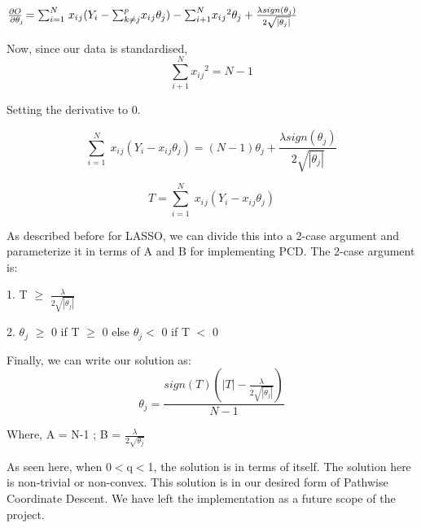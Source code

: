 \documentclass[11pt]{article}
\begin{document}
$\frac{\partial O}{\partial \theta_{\rlap{$\scriptscriptstyle j$}}} = {\sum}_{i=1}^{N} \; x_i{_j}(Y_i - {\sum}_{k\neq j}^{p} x_i{_j}\theta_j) - {\sum}_{i+1}^{N} x_i{_j}^2\theta_j + \frac{\lambda sign(\theta_j)}{2 \sqrt{|\theta_j|}}$
\newline

Now, since our data is standardised, 
\newline
\begin{equation}
    {\sum}_{i+1}^{N} x_i{_j}^2 = N-1
\end{equation}

\newline

Setting the derivative to 0. 

\newline
\begin{equation}
   {\sum}_{i=1}^{N} \; x_i{_j}(Y_i - x_i{_j}\theta_j) = (N-1)\theta_j + \frac{\lambda sign(\theta_j)}{2 \sqrt{|\theta_j|}}
\end{equation}
\newline

\begin{equation}
    T = {\sum}_{i=1}^{N} \; x_i{_j}(Y_i - x_i{_j}\theta_j)
\end{equation}
\newline

As described before for LASSO, we can divide this into a 2-case argument and parameterize it in terms of A and B for implementing PCD. 
\newline
The 2-case argument is:
\newline

1. T $\geq$ $ \frac{\lambda }{2 \sqrt{|\theta_j|}}$
\newline

2. $\theta_j$ $\geq$ 0 if T $\geq$ 0 else $\theta_j $$< $ 0 if T $<$ 0
\newline

Finally, we can write our solution as:
\newline
\begin{equation}
  \theta_j = \frac{sign(T)(|T|- \frac{\lambda}{2\sqrt{|\theta_j|}})}{N-1}
\end{equation}

\newline
Where, 
\newline
A = N-1 ; B = $\frac{\lambda}{2\sqrt{\theta_j}}$
\newline

As seen here, when 0$<$q$<$1, the solution is in terms of itself. The solution here is non-trivial or non-convex. This solution is in our desired form of Pathwise Coordinate Descent. We have left the implementation as a future scope of the project.
\end{document}

